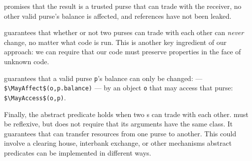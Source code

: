 
\sophiabullet
{} %
promises that the result is a
trusted purse that can trade with the receiver, %
no other valid
purse's balance is affected, and %
references %
have not been leaked.


\sophiabullet {} guarantees that
whether or not two purses can trade with each other can \textit{never}
change, no matter what code is run.  This is another key ingredient of
our approach: we can require that our code must preserve
properties in the face of unknown code.

\sophiabullet
%
guarantees that
 a valid purse \lstinline+p+'s balance can only be changed:
--- \lstinline+$\MayAffect$(o,p.balance)+ ---
by an object \lstinline{o}
that may access that purse:
\lstinline+$\MayAccess$(o,p)+.


Finally, the abstract predicate  holds when two
s can trade with each other.   must be
reflexive, but does not require that its arguments have the same
class. It guarantees that  can transfer resources from one purse
to another. This could involve a clearing house, interbank exchange,
or other mechanisms %
abstract
predicates can be implemented in different ways.

